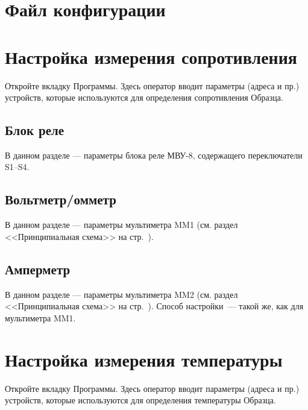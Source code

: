 \documentclass[12pt, a4paper, twocolumn]{report}
\begin{document}
\section{Файл конфигурации}



\section{Настройка измерения сопротивления}

Откройте вкладку  Программы. Здесь оператор вводит параметры (адреса и пр.) устройств, которые используются для определения сопротивления Образца.

\subsection{Блок реле}

В данном разделе --- параметры блока реле МВУ-8, содержащего переключатели S1--S4.



\subsection{Вольтметр/омметр}
\label{sec_mm1_config}

В данном разделе --- параметры мультиметра MM1 (см. раздел <<Принципиальная схема>> на стр.~\pageref{sec_schematic_diagram}).



\subsection{Амперметр}

В данном разделе --- параметры мультиметра MM2 (см. раздел <<Принципиальная схема>> на стр.~\pageref{sec_schematic_diagram}). Способ настройки~--- такой же, как для мультиметра MM1.


\section{Настройка измерения температуры}

Откройте вкладку  Программы. Здесь оператор вводит параметры (адреса и пр.) устройств, которые используются для определения температуры Образца.
\end{document}
